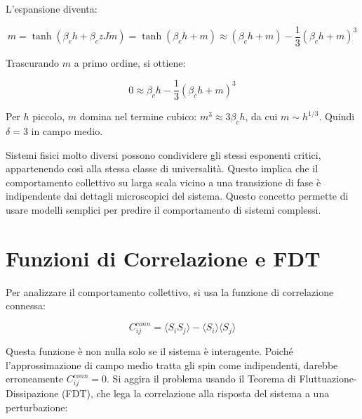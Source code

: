 L'espansione diventa:

\begin{equation*} 
m = \tanh(\beta_c h + \beta_c z J m) = \tanh(\beta_c h + m) \approx (\beta_c h + m) - \frac{1}{3}(\beta_c h + m)^3
\end{equation*}

Trascurando $m$ a primo ordine, si ottiene:

\begin{equation} \label{eq:ch18_13}
0 \approx \beta_c h - \frac{1}{3}(\beta_c h + m)^3
\end{equation}

Per $h$ piccolo, $m$ domina nel termine cubico: $m^3 \approx 3 \beta_c h$, da cui $m \sim h^{1/3}$.
Quindi $\delta = 3$ in campo medio.

Sistemi fisici molto diversi possono condividere gli stessi esponenti critici, appartenendo così alla stessa classe di universalità. Questo implica che il comportamento collettivo su larga scala vicino a una transizione di fase è indipendente dai dettagli microscopici del sistema. Questo concetto permette di usare modelli semplici per predire il comportamento di sistemi complessi.


\section{Funzioni di Correlazione e FDT}
Per analizzare il comportamento collettivo, si usa la funzione di correlazione connessa:

\begin{equation} \label{eq:ch18_14}
C_{ij}^{conn} = \langle S_i S_j \rangle - \langle S_i \rangle \langle S_j \rangle
\end{equation}

Questa funzione è non nulla solo se il sistema è interagente. Poiché l'approssimazione di campo medio tratta gli spin come indipendenti, darebbe erroneamente $C_{ij}^{conn} = 0$. Si aggira il problema usando il Teorema di Fluttuazione-Dissipazione (FDT), che lega la correlazione alla risposta del sistema a una perturbazione:

\vspace{0.5cm}
\noindent{}
\vspace{0.5cm}

